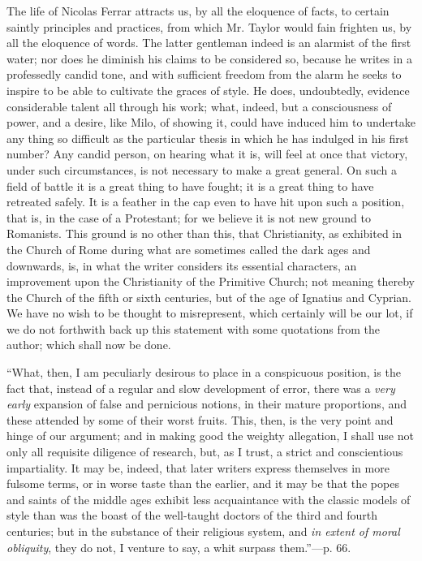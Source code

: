 The life of Nicolas Ferrar attracts us, by all the
eloquence of facts, to certain saintly principles and practices, from
which Mr. Taylor would fain frighten us, by all the eloquence of words.
The latter gentleman indeed is an alarmist of the first water; nor does
he diminish his claims to be considered so, because he writes in a
professedly candid tone, and with sufficient freedom from the alarm he
seeks to inspire to be able to cultivate the graces of style. He does,
undoubtedly, evidence considerable talent all through his work; what,
indeed, but a consciousness of power, and a desire, like Milo, of
showing it, could have induced him to undertake any thing so
difficult as the particular thesis in which he has indulged in his first
number? Any candid person, on hearing what it is, will feel at once that
victory, under such circumstances, is not necessary to make a great
general. On such a field of battle it is a great thing to have fought;
it is a great thing to have retreated safely. It is a feather in the cap
even to have hit upon such a position, that is, in the case of a
Protestant; for we believe it is not new ground to Romanists. This
ground is no other than this, that Christianity, as exhibited in the
Church of Rome during what are sometimes called the dark ages and
downwards, is, in what the writer considers its essential characters, an
improvement upon the Christianity of the Primitive Church; not meaning
thereby the Church of the fifth or sixth centuries, but of the age of
Ignatius and Cyprian. We have no wish to be thought to misrepresent,
which certainly will be our lot, if we do not forthwith back up this
statement with some quotations from the author; which shall now be done.

``What, then, I am peculiarly desirous to place in a
conspicuous position, is the fact that, instead of a regular and slow
development of error, there was a \emph{very early} expansion of false
and pernicious notions, in their mature proportions, and these attended
by some of their worst fruits. This, then, is the very point and hinge
of our argument; and in making good the weighty allegation, I shall use
not only all requisite diligence of research, but, as I trust, a strict
and conscientious impartiality. It may be, indeed, that later writers
express themselves in more fulsome terms, or in worse taste than the
earlier, and it may be that the popes and saints of the middle ages
exhibit less acquaintance with the classic models of style than was the
boast of the well-taught doctors of the third and fourth centuries; but
in the substance of their religious system, and \emph{in extent of moral
obliquity}, they do not, I venture to say, a whit surpass them.''—p.
66.

